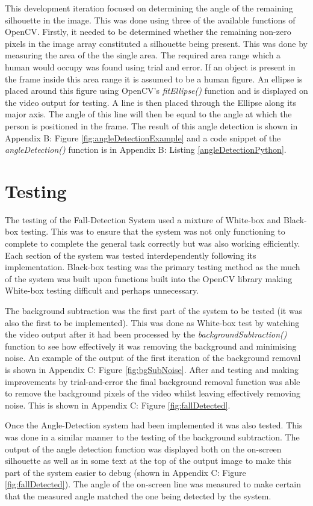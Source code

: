 \documentclass[11pt,a4paper]{report}
\begin{document}
This development iteration focused on determining the angle of the remaining silhouette in the image. This was done using three of the available functions of OpenCV. Firstly, it needed to be determined whether the remaining non-zero pixels in the image array constituted a silhouette being present. This was done by measuring the area of the the single area. The required area range which a human would occupy was found using trial and error. If an object is present in the frame inside this area range it is assumed to be a human figure. An ellipse is placed around this figure using OpenCV's \textit{fitEllipse()} function and is displayed on the video output for testing. A line is then placed through the Ellipse along its major axis. The angle of this line will then be equal to the angle at which the person is positioned in the frame. The result of this angle detection is shown in Appendix B: Figure \ref{fig:angleDetectionExample} and a code snippet of the \textit{angleDetection()} function is in Appendix B: Listing \ref{angleDetectionPython}.

\pagebreak
\section{Testing}
The testing of the Fall-Detection System used a mixture of White-box and Black-box testing. This was to ensure that the system was not only functioning to complete to complete the general task correctly but was also working efficiently. Each section of the system was tested interdependently following its implementation. Black-box testing was the primary testing method as the much of the system was built upon functions built into the OpenCV library making White-box testing difficult and perhaps unnecessary.

The background subtraction was the first part of the system to be tested (it was also the first to be implemented). This was done as White-box test by watching the video output after it had been processed by the \textit{backgroundSubtraction()} function to see how effectively it was removing the background and minimising noise. An example of the output of the first iteration of the background removal is shown in Appendix C: Figure \ref{fig:bgSubNoise}. After and testing and making improvements by trial-and-error the final background removal function was able to remove the background pixels of the video whilst leaving effectively removing noise. This is shown in Appendix C: Figure \ref{fig:fallDetected}.

Once the Angle-Detection system had been implemented it was also tested. This was done in a similar manner to the testing of the background subtraction. The output of the angle detection function was displayed both on the on-screen silhouette as well as in some text at the top of the output image to make this part of the system easier to debug (shown in Appendix C: Figure \ref{fig:fallDetected}). The angle of the on-screen line was measured to make certain that the measured angle matched the one being detected by the system.
\end{document}

